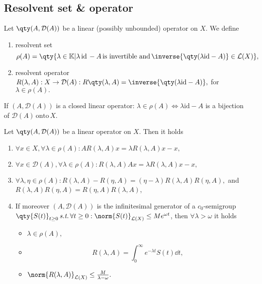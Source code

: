 \subsection{Resolvent set \& operator}
\label{sec:resolvent}

\begin{definition}
	Let $\qty(A, \mathcal{D}(A))$ be a linear (possibly unbounded) operator on $X$. We define 
	\begin{enumerate}
		\item resolvent set
			\[
				\rho(A) = \qty{\lambda \in \mathbb{K}| \lambda \, \text{id} \, - A \, \text{is invertible and} \, \inverse{\qty(\lambda \text{id} - A)} \in \mathcal{L}(X)},
			\]
		\item resolvent operator $R(\lambda, A):X \to \mathcal{D}(A): R\qty(\lambda, A) =\inverse{\qty(\lambda \text{id} - A)},$ for $\lambda \in \rho(A).$
	\end{enumerate}
	\end{definition}
\begin{remark}
	If $(A, \mathcal{D}(A))$ is a closed linear operator: $\lambda \in \rho(A) \Leftrightarrow \lambda \text{id} - A$ is a bijection of $\mathcal{D}(A) \, \text{onto} \, X.$
\end{remark}

\begin{lemma}
    Let $\qty(A, \mathcal{D}(A))$ be a linear operator on $X$. Then it holds

    \begin{enumerate}
	\item $\forall x \in X, \forall \lambda \in \rho(A): AR(\lambda, A)x = \lambda R(\lambda, A)x - x,$
	\item $\forall x \in \mathcal{D}(A), \forall \lambda \in \rho(A): R(\lambda, A)Ax = \lambda R(\lambda, A)x - x,$
	\item $\forall \lambda, \eta \in \rho(A): R(\lambda, A) - R(\eta, A) = (\eta - \lambda) R(\lambda, A) R(\eta, A),$ and $R(\lambda, A) R(\eta, A) = R(\eta, A) R(\lambda, A)$,
	\item If moreover $(A, \mathcal{D}(A))$ is the infinitesimal generator of a $c_0$-semigroup $\qty{S(t)}_{t\geq 0} \, \text{\textit{s.t.}} \, \forall t\geq 0: \norm{S(t)}_{\mathcal{L}(X)} \leq Me^{\omega t}$, then $\forall \lambda > \omega$ it holds
		\begin{itemize}
			\item $\lambda \in \rho(A),$ 
			\item
				\[
					R(\lambda, A) = \int_0^\infty e^{-\lambda t} S(t) \dd{t},
				\]
			\item $\norm{R(\lambda, A)}_{\mathcal{L}(X)} \leq \frac{M}{\lambda- \omega}.$
		\end{itemize}
    \end{enumerate}
\end{lemma}

